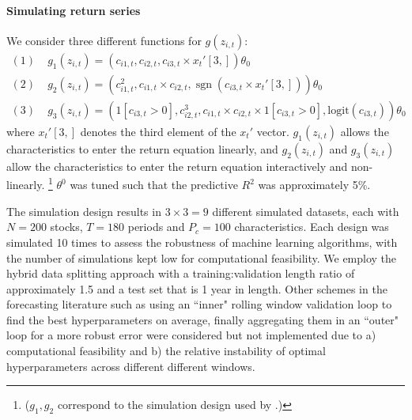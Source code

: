 \documentclass{article}
\begin{document}
\paragraph{Simulating return series}
We consider three different functions for $g(z_{i, t})$:
\begin{align}
(1)\; & g_1 \left(z_{i, t}\right)=\left(c_{i 1, t}, c_{i 2, t}, c_{i 3, t} \times x_{t}'[3,]\right) \theta_{0} \\
(2)\; & g_2 \left(z_{i, t}\right)=\left(c_{i 1, t}^{2}, c_{i 1, t} \times c_{i 2, t}, \operatorname{sgn}\left(c_{i 3, t} \times  x_{t}'[3,]\right)\right) \theta_{0} \\
(3)\; & g_3 \left(z_{i, t}\right) = \left(1[c_{i3,t}>0],c_{i 2, t}^{3}, c_{i 1, t} \times c_{i 2, t}\times 1[c_{i3,t}>0], \text{logit}\left({c}_{i3, t} \right)\right) \theta_{0}
\end{align}
where $x_{t}'[3,]$ denotes the third element of the $x_{t}'$ vector.
$g_1 \left(z_{i, t}\right)$ allows the characteristics to enter the return equation linearly, and $g_2 \left(z_{i, t}\right)$ and $g_3 \left(z_{i, t}\right)$ allow the characteristics to enter the return equation interactively and non-linearly. \footnote{($g_1, g_2$ correspond to the simulation design used by \cite{gu_empirical_2019}.)} $\theta^0$ was tuned such that the predictive $R^2$ was approximately 5\%.

The simulation design results in $3 \times 3 = 9$ different simulated datasets, each with $N = 200$ stocks, $T = 180$ periods and $P_c = 100$ characteristics. Each design was simulated 10 times to assess the robustness of machine learning algorithms, with the number of simulations kept low for computational feasibility. We employ the hybrid data splitting approach with a training:validation length ratio of approximately 1.5 and a test set that is 1 year in length. Other schemes in the forecasting literature such as using an ``inner" rolling window validation loop to find the best hyperparameters on average, finally aggregating them in an ``outer" loop for a more robust error were considered but not implemented due to a) computational feasibility and b) the relative instability of optimal hyperparameters across different different windows.
\end{document}
